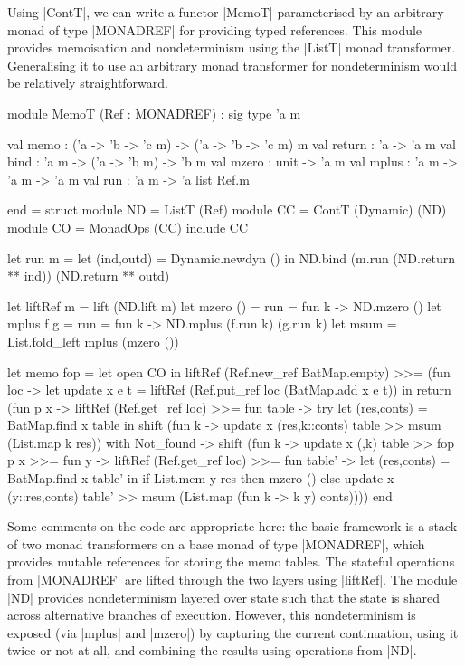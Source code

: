 Using |ContT|, we can write a functor |MemoT| parameterised by 
an arbitrary monad of type |MONADREF| for providing typed references. This
module provides memoisation and nondeterminism using the |ListT| monad transformer.
Generalising it to use an arbitrary monad transformer for nondeterminism would
be relatively straightforward.
\begin{ocaml}
	module MemoT (Ref : MONADREF) : sig
		type 'a m

		val memo  : ('a -> 'b -> 'c m) -> ('a -> 'b -> 'c m) m
		val return : 'a -> 'a m
		val bind   : 'a m -> ('a -> 'b m) -> 'b m
		val mzero  : unit -> 'a m
		val mplus  : 'a m -> 'a m -> 'a m
		val run    : 'a m -> 'a list Ref.m

	end = struct
		module ND = ListT (Ref)
		module CC = ContT (Dynamic) (ND)
    module CO = MonadOps (CC)
		include CC

		let run m =
			let (ind,outd) = Dynamic.newdyn () in
			ND.bind (m.run (ND.return ** ind)) (ND.return ** outd)

		let liftRef m  = lift (ND.lift m)
		let mzero ()  = {{run = fun k -> ND.mzero ()}}
		let mplus f g = {{run = fun k -> ND.mplus (f.run k) (g.run k)}}
		let msum      = List.fold_left mplus (mzero ())

		let memo fop = let open CO in
			liftRef (Ref.new_ref BatMap.empty) >>= (fun loc ->
			let update x e t = liftRef (Ref.put_ref loc (BatMap.add x e t)) in
			return (fun p x ->
				liftRef (Ref.get_ref loc) >>= fun table ->
				try let (res,conts) = BatMap.find x table in
					shift (fun k -> update x (res,k::conts) table >>
													msum (List.map k res))
				with Not_found ->
					shift (fun k -> update x ({},{k}) table >>
													fop p x >>= fun y ->
													liftRef (Ref.get_ref loc) >>= fun table' ->
													let (res,conts) = BatMap.find x table' in
													if List.mem y res then mzero ()
													else update x (y::res,conts) table' >>
															 msum (List.map (fun k -> k y) conts))))
	end
\end{ocaml}
Some comments on the code are appropriate here: the basic framework is
a stack of two monad transformers on a base monad of type |MONADREF|, which
provides mutable references for storing the memo tables. The stateful
operations from |MONADREF| are lifted through the two layers using |liftRef|. 
The module |ND| provides nondeterminism layered over state such that the state
is shared across alternative branches of execution. However, this nondeterminism
is exposed (via |mplus| and |mzero|) by capturing the current continuation, using 
it twice or not at all, and combining the results using operations from |ND|.


